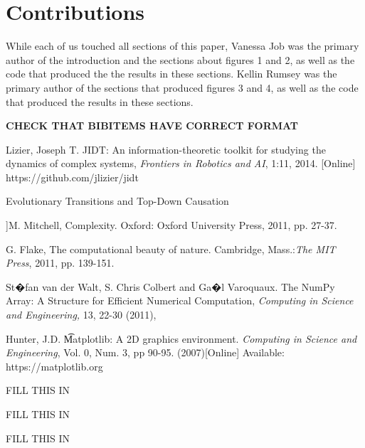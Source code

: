 \documentclass[conference]{IEEEtran}
\begin{document}


\section{Contributions}

While each of us touched all sections of this paper, Vanessa Job was the primary author of the introduction and the sections about figures 1 and 2, as well as the code that produced the the results in these sections.   Kellin Rumsey was the primary author of the sections that produced figures 3 and 4, as well as the code that produced the results in these sections.  




%
%
%
{\bf CHECK THAT BIBITEMS HAVE CORRECT FORMAT }
\begin{thebibliography}{1}
  
  Lizier, Joseph T. 
  JIDT: An information-theoretic toolkit for studying the dynamics of complex systems, {\it Frontiers in Robotics and AI}, 1:11, 2014. [Online]  
  https://github.com/jlizier/jidt

 Evolutionary Transitions and Top-Down Causation

 ]M. Mitchell, Complexity. Oxford: Oxford University Press, 2011, pp. 27-37.

 G. Flake, The computational beauty of nature. Cambridge, Mass.:{\it  The MIT Press}, 2011, pp. 139-151.

 St�fan van der Walt, S. Chris Colbert and Ga�l Varoquaux. The NumPy Array: A Structure for Efficient Numerical Computation, {\it Computing in Science and Engineering,} 13, 22-30 (2011),

 Hunter, J.D. {\t Matplotlib: A 2D graphics environment}.  {\it Computing in Science and Engineering}, Vol. 0, Num. 3, pp 90-95.  (2007)[Online]
Available: https://matplotlib.org

 FILL THIS IN

 FILL THIS IN

 FILL THIS IN
\end{thebibliography}




\end{document}
